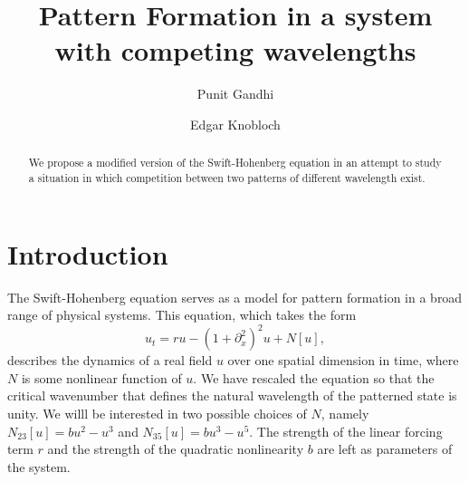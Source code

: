 \documentclass[api,pof,pre,12pt,a4paper]{revtex4-1}
\begin{document}

\title{Pattern Formation in a system with competing wavelengths}

\author{Punit Gandhi}
\author{Edgar Knobloch}

\begin{abstract}
We propose a modified version of the Swift-Hohenberg equation in an attempt to study a situation in which competition between two patterns of different wavelength exist.
\end{abstract}

\maketitle

\section{Introduction}
The Swift-Hohenberg equation serves as a model for pattern formation in a broad range of physical systems.   This equation, which takes the form  
\begin{equation}
u_t= r u-\left(1+\partial_{x}^2\right)^2u+N[u]\label{eq:SH},
\end{equation}
describes the dynamics of a real field $u$ over one spatial dimension in time, where $N$ is some nonlinear function of $u$.  We have rescaled the equation so that the critical wavenumber that defines the natural wavelength of the patterned state is unity.  We willl be interested in two possible choices of $N$, namely $N_{23}[u]=bu^2-u^3$ and $N_{35}[u]=b u^3-u^5$.  The strength of the linear forcing term $r$ and the strength of the quadratic nonlinearity $b$ are left as parameters of the system.  
\end{document}

